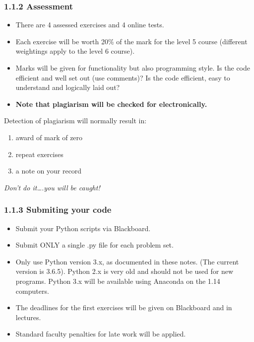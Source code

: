 \documentclass[10pt]{article}
\providecommand{\tightlist}{%
      \setlength{\itemsep}{0pt}\setlength{\parskip}{0pt}}
\begin{document}
    \hypertarget{assessment}{%
\subsubsection*{1.1.2 Assessment}\label{assessment}}

\begin{itemize}
\tightlist
\item
  There are 4 assessed exercises and 4 online tests.
\item
  Each exercise will be worth 20\% of the mark for the level 5 course
  (different weightings apply to the level 6 course).
\item
  Marks will be given for functionality but also programming style. Is
  the code efficient and well set out (use comments)? Is the code
  efficient, easy to understand and logically laid out?
\item
  \textbf{Note that plagiarism will be checked for electronically.}
\end{itemize}

Detection of plagiarism will normally result in:

\begin{enumerate}
\def\labelenumi{\arabic{enumi}.}
\tightlist
\item
  award of mark of zero
\item
  repeat exercises
\item
  a note on your record
\end{enumerate}

\emph{Don't do it\ldots{}.you will be caught!}

    \hypertarget{submiting-your-code}{%
\subsubsection*{1.1.3 Submiting your code}\label{submiting-your-code}}

\begin{itemize}
\tightlist
\item
  Submit your Python scripts via Blackboard.
\item
  Submit ONLY a single .py file for each problem set.
\item
  Only use Python version 3.x, as documented in these notes. (The
  current version is 3.6.5). Python 2.x is very old and should not be
  used for new programs. Python 3.x will be available using Anaconda on
  the 1.14 computers.
\item
  The deadlines for the first exercises will be given on Blackboard and
  in lectures.
\item
  Standard faculty penalties for late work will be applied.
\end{itemize}
\end{document}
